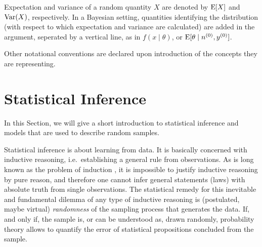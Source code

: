 Expectation and variance of a random quantity $X$ are denoted by $\operatorname{E}[X]$ and $\operatorname{Var}(X)$, respectively.
In a Bayesian setting, quantities identifying the distribution
(with respect to which expectation and variance are calculated)
are added in the argument, seperated by a vertical line, as in $f(x\mid\theta)$, or $\operatorname{E}[\theta\mid n^{(0)}, y^{(0)}]$.

Other notational conventions are declared upon introduction of the concepts they are representing.


\section{Statistical Inference}
\label{sec:stat-inference}


In this Section, we will give a short introduction to statistical inference
and models that are used to describe random samples.

Statistical inference is about learning from data.
It is basically concerned with inductive reasoning,
i.e.\ establishing a general rule from observations.
As is long known as the problem of induction \parencite{1739:hume},
it is impossible to justify inductive reasoning by pure reason,
and therefore one cannot infer general statements (laws) with absolute truth from single observations.
The statistical remedy for this inevitable and fundamental dilemma of any type of inductive reasoning is
(postulated, maybe virtual) \emph{randomness} of the sampling process that generates the data.
If, and only if, the sample is, or can be understood as, drawn randomly,
probability theory allows to quantify the error of statistical propositions concluded from the sample.

